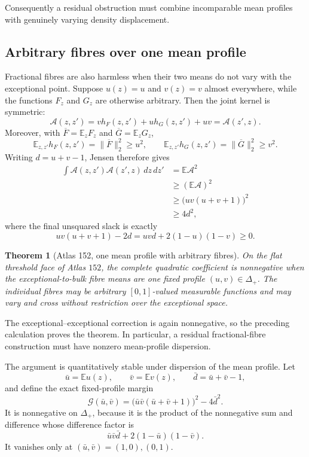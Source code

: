 \documentclass[11pt]{article}
\newtheorem{theorem}{Theorem}[section]
\begin{document}
Consequently a residual obstruction must combine incomparable mean profiles
with genuinely varying density displacement.

\subsection{Arbitrary fibres over one mean profile}

Fractional fibres are also harmless when their two means do not vary with
the exceptional point.  Suppose $u(z)=u$ and $v(z)=v$ almost everywhere,
while the functions $F_z$ and $G_z$ are otherwise arbitrary.  Then the joint
kernel is symmetric:
\[
 \mathcal A(z,z')=v h_F(z,z')+u h_G(z,z')+uv
                 =\mathcal A(z',z).
\]
Moreover, with $\overline F=\mathbb E_zF_z$ and
$\overline G=\mathbb E_zG_z$,
\[
 \mathbb E_{z,z'}h_F(z,z')=\|\overline F\|_2^2\geq u^2,
 \qquad
 \mathbb E_{z,z'}h_G(z,z')=\|\overline G\|_2^2\geq v^2.
\]
Writing $d=u+v-1$, Jensen therefore gives
\begin{align*}
 \int\mathcal A(z,z')\mathcal A(z',z)\,dz\,dz'
 &=\mathbb E\mathcal A^2\\
 &\geq(\mathbb E\mathcal A)^2\\
 &\geq\bigl(uv(u+v+1)\bigr)^2\\
 &\geq4d^2,
\end{align*}
where the final unsquared slack is exactly
\[
 uv(u+v+1)-2d
 =uvd+2(1-u)(1-v)\geq0.
\]

\begin{theorem}[Atlas 152, one mean profile with arbitrary fibres]
\label{thm:atlas152-single-mean}
On the flat threshold face of Atlas $152$, the complete quadratic
coefficient is nonnegative when the exceptional-to-bulk fibre means are one
fixed profile $(u,v)\in\Delta_+$.  The individual fibres may be arbitrary
$[0,1]$-valued measurable functions and may vary and cross without
restriction over the exceptional space.
\end{theorem}

The exceptional--exceptional correction is again nonnegative, so the
preceding calculation proves the theorem.  In particular, a residual
fractional-fibre construction must have nonzero mean-profile dispersion.

The argument is quantitatively stable under dispersion of the mean profile.
Let
\[
 \bar u=\mathbb E u(z),\qquad
 \bar v=\mathbb E v(z),\qquad
 \bar d=\bar u+\bar v-1,
\]
and define the exact fixed-profile margin
\begin{equation}
 \mathcal G(\bar u,\bar v)
 =\bigl(\bar u\bar v(\bar u+\bar v+1)\bigr)^2-4\bar d^2.
 \label{eq:atlas152-profile-margin}
\end{equation}
It is nonnegative on $\Delta_+$, because it is the product of the
nonnegative sum and difference whose difference factor is
\[
 \bar u\bar v\bar d+2(1-\bar u)(1-\bar v).
\]
It vanishes only at $(\bar u,\bar v)=(1,0),(0,1)$.
\end{document}
